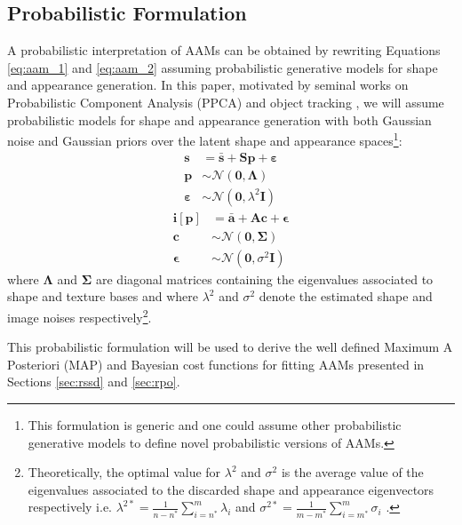 \subsection{Probabilistic Formulation}
\label{sec:probabilistic_aam}

A probabilistic interpretation of AAMs can be obtained by rewriting Equations \ref{eq:aam_1} and \ref{eq:aam_2} assuming probabilistic generative models for shape and appearance generation. In this paper, motivated by seminal works on Probabilistic Component Analysis (PPCA) and object tracking \cite{Tipping1999, Roweis1998, Moghaddam1997}, we will assume probabilistic models for shape and appearance generation with both Gaussian noise and Gaussian priors over the latent shape and appearance spaces\footnote{This formulation is generic and one could assume other probabilistic generative models \cite{vanderMaaten2010, Bach2005, Prince2012, Nicolau2014} to define novel probabilistic versions of AAMs.}:
\begin{equation}
	\begin{aligned}
		\mathbf{s} & = \bar{\mathbf{s}} + \mathbf{S} \mathbf{p} + \boldsymbol{\varepsilon}
		\\
		\mathbf{p} & \sim \mathcal{N} \left( \mathbf{0}, \mathbf{\Lambda} \right) 
		\\
		\boldsymbol{\varepsilon} & \sim \mathcal{N} \left( \mathbf{0}, \lambda^2 \mathbf{I} \right) 
	\end{aligned}
\end{equation}
\begin{equation}
	\begin{aligned}
		\mathbf{i}[\mathbf{p}] & = \bar{\mathbf{a}} + \mathbf{A} \mathbf{c} + \boldsymbol{\epsilon}
		\\
		\mathbf{c} & \sim \mathcal{N} \left( \mathbf{0}, \mathbf{\Sigma} \right) 
		\\
		\boldsymbol{\epsilon} & \sim \mathcal{N} \left( \mathbf{0}, \sigma^2 \mathbf{I} \right) 
	\end{aligned}
\end{equation}
where $\mathbf{\Lambda}$ and $\mathbf{\Sigma}$ are diagonal matrices containing the eigenvalues associated to shape and texture bases and where $\lambda^2$ and $\sigma^2$ denote the estimated shape and image noises respectively\footnote{\label{foot:noise}Theoretically, the optimal value for $\lambda^2$ and $\sigma^2$ is the average value of the eigenvalues associated to the discarded shape and appearance eigenvectors respectively i.e. \mbox{$\lambda^{2*} = \frac{1}{n-n^*}\sum_{i=n^*}^m \lambda_{i}$} and \mbox{$\sigma^{2*} = \frac{1}{m-m^*}\sum_{i=m^*}^m \sigma_{i}$} \cite{Moghaddam1997}.}.

This probabilistic formulation will be used to derive the well defined Maximum A Posteriori (MAP) and Bayesian cost functions for fitting AAMs presented in Sections \ref{sec:rssd} and \ref{sec:rpo}.

